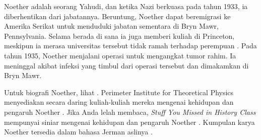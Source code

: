 \documentclass[../../../include/open-logic-section]{subfiles}
\begin{document}
Noether adalah seorang Yahudi, dan ketika Nazi berkuasa pada tahun 1933, ia
diberhentikan dari jabatannya. Beruntung, Noether dapat beremigrasi ke
Amerika Serikat untuk menduduki jabatan sementara di Bryn Mawr,
Pennsylvania. Selama berada di sana ia juga memberi kuliah di Princeton,
meskipun ia merasa universitas tersebut tidak ramah terhadap perempuan
\citep[81]{Dick1981}. Pada tahun 1935, Noether menjalani operasi untuk
mengangkat tumor rahim. Ia meninggal akibat infeksi yang timbul dari operasi
tersebut dan dimakamkan di Bryn Mawr.

\begin{reading}
Untuk biografi Noether, lihat \citet{Dick1981}. Perimeter Institute for
Theoretical Physics menyediakan secara daring kuliah-kuliah mereka mengenai
kehidupan dan pengaruh Noether \citep{Perimeter2015}. Jika Anda lelah
membaca, \emph{Stuff You Missed in History Class} mempunyai siniar mengenai
kehidupan dan pengaruh Noether \citep{Frey2015}. Kumpulan karya Noether
tersedia dalam bahasa Jerman aslinya \citep{Noether1983}.
\end{reading}
\end{document}
